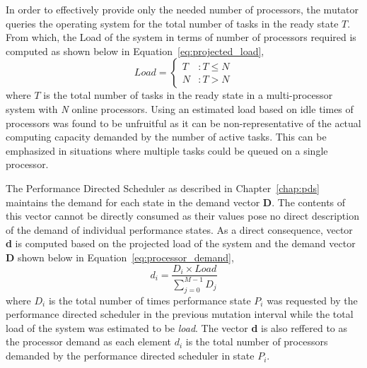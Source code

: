 In order to effectively provide only the needed number of processors, the mutator
queries the operating system for the total number of tasks in the ready state $T$. 
From which, the Load of the system in terms of number of processors required is computed 
as shown below in Equation~\eqref{eq:projected_load},
\begin{equation}
    Load = \left\{
     \begin{array}{lr}
       T & : T \leq N\\
       N & : T > N
     \end{array}
   \right.
\label{eq:projected_load}
\end{equation}
where $T$ is the total number of tasks in the ready state in a multi-processor system with \textit{N} online processors.
Using an estimated load based on idle times
of processors was found to be unfruitful as it can be non-representative of the actual 
computing capacity demanded by the number of active tasks. This can be emphasized in situations where multiple
tasks could be queued on a single processor.

The Performance Directed Scheduler as described in Chapter~\ref{chap:pds} maintains
the demand for each state in the demand vector \textbf{D}. The contents of this vector
cannot be directly consumed as their values pose no direct description of the demand 
of individual performance states. As a direct consequence, vector \textbf{d} is computed based 
on the projected load of the system and the demand vector \textbf{D} shown below in Equation~\eqref{eq:processor_demand},
\begin{equation}
    d_{i} = \frac{D_{i} \times Load}{\displaystyle\sum_{j=0}^{M-1} {D_{j}}}
\label{eq:processor_demand}
\end{equation}
where $D_i$ is the total number of times performance state $P_i$ was requested by the performance directed scheduler in 
the previous mutation interval while the total load of the system was estimated to be \textit{load}. The vector \textbf{d}
is also reffered to as the processor demand as each element $d_i$ is the total number of processors demanded by the 
performance directed scheduler in state $P_i$. 

